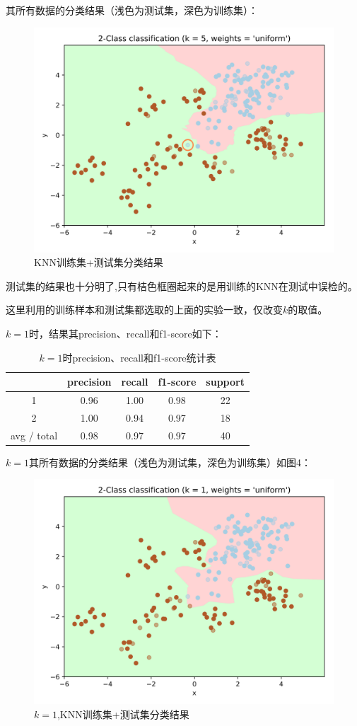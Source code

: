 \documentclass{article}
\newcommand{\hs}{\hspace{2em}}
\begin{document}
\hs 其所有数据的分类结果（浅色为测试集，深色为训练集）：

\begin{figure}[htbp]
	\centering
	\includegraphics[width=0.6\linewidth]{img//fig7.png}
	\caption{KNN训练集+测试集分类结果}
\end{figure}

\hs 测试集的结果也十分明了,只有桔色框圈起来的是用训练的KNN在测试中误检的。\\


{}

\hs 这里利用的训练样本和测试集都选取的上面的实验一致，仅改变$k$的取值。

\hs $k=1$时，结果其precision、recall和f1-score如下：

\begin{table}[htbp]
	\caption{$k=1$时precision、recall和f1-score统计表}
	\centering
	\begin{tabular}{c|cccc}	
		& precision&recall&f1-score & support \\
		\hline
		1    &   0.96  &    1.00 &    0.98  &      22\\
		2    &   1.00    &  0.94   &   0.97    &    18 \\
		avg / total    &   0.98  &    0.97  &    0.97 &       40
	\end{tabular}	
\end{table}

\hs $k=1$其所有数据的分类结果（浅色为测试集，深色为训练集）如图4：

\begin{figure}[htbp]
	\centering
	\includegraphics[width=0.6\linewidth]{img//fig2.png}
	\caption{$k=1$,KNN训练集+测试集分类结果}
\end{figure}
\end{document}
